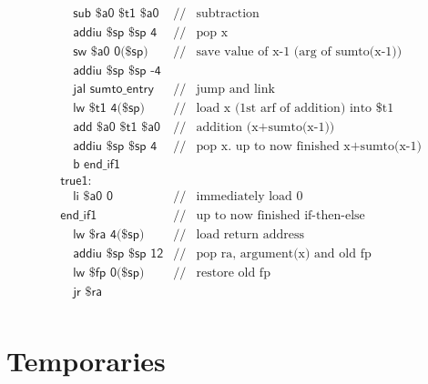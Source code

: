 \begin{align*}
&\quad\textsf{sub \$a0 \$t1 \$a0}&//&\text{subtraction}\\
&\quad\textsf{addiu \$sp \$sp 4}&//&\text{pop x}\\
&\quad\textsf{sw \$a0 0(\$sp)}&//&\text{save value of x-1 (arg of sumto(x-1))}\\
&\quad\textsf{addiu \$sp \$sp -4}\\
&\quad\textsf{jal sumto\_entry}&//&\text{jump and link}\\
&\quad\textsf{lw \$t1 4(\$sp)}&//&\text{load x (1st arf of addition) into \$t1}\\
&\quad\textsf{add \$a0 \$t1 \$a0}&//&\text{addition (x+sumto(x-1))}\\
&\quad\textsf{addiu \$sp \$sp 4}&//&\text{pop x. up to now finished x+sumto(x-1)}\\
&\quad\textsf{b end\_if1}&&\\
&\textsf{true1:}&&\\
&\quad\textsf{li \$a0 0}&//&\text{immediately load 0}\\
&\textsf{end\_if1}&//&\text{up to now finished if-then-else}\\
&\quad\textsf{lw \$ra 4(\$sp)}&//&\text{load return address}\\
&\quad\textsf{addiu \$sp \$sp 12}&//&\text{pop ra, argument(x) and old fp}\\
&\quad\textsf{lw \$fp 0(\$sp)}&//&\text{restore old fp}\\
&\quad\textsf{jr \$ra}&&\\
\end{align*}
\section{Temporaries}
\ifx\PREAMBLE\undefined

\fi
